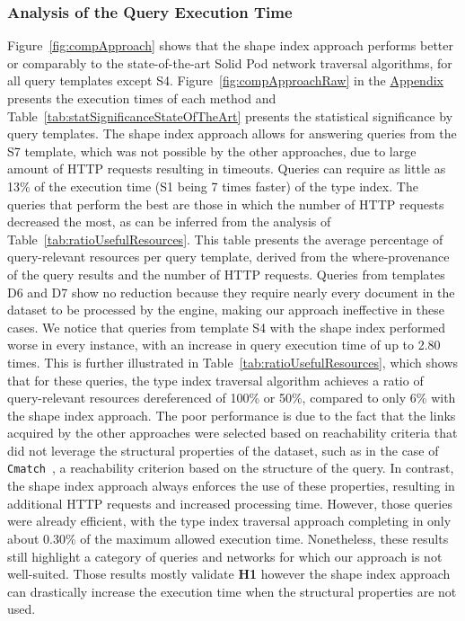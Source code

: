 \subsubsection{Analysis of the Query Execution Time}
Figure~\ref{fig:compApproach} shows that the shape index approach performs better or comparably to the state-of-the-art Solid Pod network traversal algorithms, for all query templates except S4.
Figure~\ref{fig:compApproachRaw} in the \hyperref[sec:appendix]{Appendix} presents the execution times of each method and Table~\ref{tab:statSignificanceStateOfTheArt} presents the statistical significance by query templates.
The shape index approach allows for answering queries from the S7 template, which was not possible by the other approaches, due to large amount of HTTP requests resulting in timeouts.
Queries can require as little as 13\% of the execution time (S1 being 7 times faster) of the type index.
The queries that perform the best are those in which the number of HTTP requests decreased the most, as can be inferred from the analysis of Table~\ref{tab:ratioUsefulResources}.
This table presents the average percentage of query-relevant resources per query template, derived from the where-provenance~\cite{buneman2001and} of the query results and the number of HTTP requests. 
Queries from templates D6 and D7 show no reduction because they require nearly every document in the dataset to be processed by the engine, making our approach ineffective in these cases.
We notice that queries from template S4 with the shape index performed worse in every instance, with an increase in query execution time of up to 2.80 times.
This is further illustrated in Table~\ref{tab:ratioUsefulResources}, which shows that for these queries, the type index traversal algorithm achieves a ratio of query-relevant resources dereferenced of 100\% or 50\%, compared to only 6\% with the shape index approach.
The poor performance is due to the fact that the links acquired by the other approaches were selected based on reachability criteria that did not leverage the structural properties of the dataset, such as in the case of \texttt{Cmatch}~\cite{hartig2016walking}, a reachability criterion based on the structure of the query.
In contrast, the shape index approach always enforces the use of these properties, resulting in additional HTTP requests and increased processing time.
However, those queries were already efficient, with the type index traversal approach completing in only about 0.30\% of the maximum allowed execution time.
Nonetheless, these results still highlight a category of queries and networks for which our approach is not well-suited.
Those results mostly validate \textbf{H1} however the shape index approach can drastically increase the execution time when the structural properties are not used.


